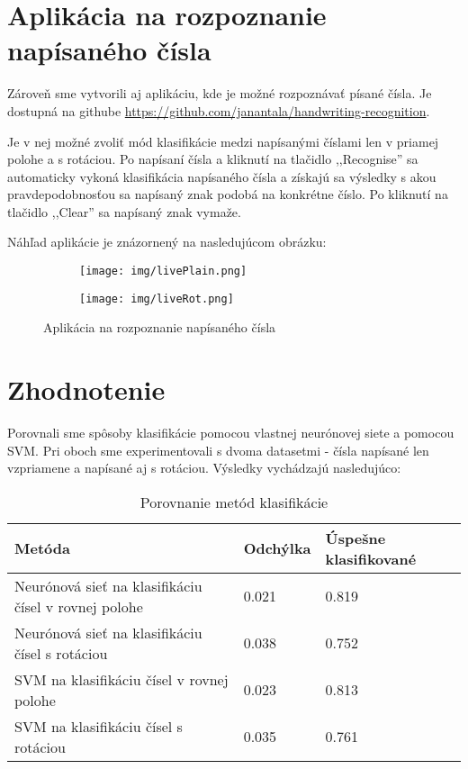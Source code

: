 \section{Aplikácia na rozpoznanie napísaného čísla} %
\label{sec:rozpoznanie_v_re_lnom_ase}

Zároveň sme vytvorili aj aplikáciu, kde je možné rozpoznávať písané čísla. Je dostupná na githube \url{https://github.com/janantala/handwriting-recognition}.

Je v nej možné zvoliť mód klasifikácie medzi napísanými číslami len v priamej polohe a s rotáciou. Po napísaní čísla a kliknutí na tlačidlo ,,Recognise'' sa automaticky vykoná klasifikácia napísaného čísla a získajú sa výsledky s akou pravdepodobnosťou sa napísaný znak podobá na konkrétne číslo. Po kliknutí na tlačidlo ,,Clear'' sa napísaný znak vymaže.

Náhľad aplikácie je znázornený na nasledujúcom obrázku:\\

\begin{figure}[H]
        \centering
        \begin{subfigure}[b]{0.3\textwidth}
                \centering
                \texttt{[image: img/livePlain.png]}
        \end{subfigure}
        \begin{subfigure}[b]{0.3\textwidth}
                \centering
                \texttt{[image: img/liveRot.png]}
        \end{subfigure}

        \caption[Aplikácia na rozpoznanie napísaného čísla]{Aplikácia na rozpoznanie napísaného čísla}
    \label{fig:tnavphones}
\end{figure}


\newpage
\section{Zhodnotenie} %
\label{sec:zhodnotenie}

Porovnali sme spôsoby klasifikácie pomocou vlastnej neurónovej siete a pomocou SVM. Pri oboch sme experimentovali s dvoma datasetmi - čísla napísané len vzpriamene a napísané aj s rotáciou. Výsledky vychádzajú nasledujúco:

\begin{table}[H]
  \begin{tabular}{ | l | l | l |}
    \hline
    Metóda & Odchýlka & Úspešne klasifikované \\ \hline
    Neurónová sieť na klasifikáciu čísel v rovnej polohe & 0.021 & 0.819 \\ \hline
    Neurónová sieť na klasifikáciu čísel s rotáciou & 0.038 & 0.752 \\ \hline
    SVM na klasifikáciu čísel v rovnej polohe & 0.023 & 0.813 \\ \hline
    SVM na klasifikáciu čísel s rotáciou & 0.035 & 0.761 \\
    \hline
  \end{tabular}
  \caption[Porovnanie metód klasifikácie]{Porovnanie metód klasifikácie}
\end{table}

